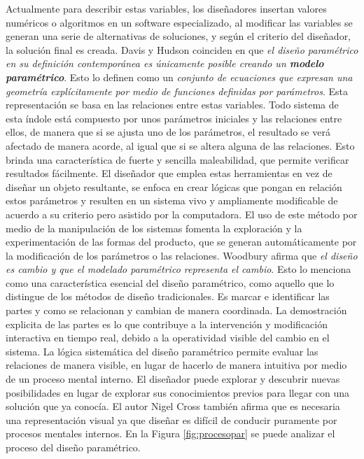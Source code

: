  Actualmente para describir estas variables, los diseñadores
insertan valores numéricos o algoritmos en un software especializado, al modificar las
variables se generan una serie de alternativas de soluciones, y según el criterio del diseñador, la solución final es creada. Davis y Hudson \citep{Kaled2016} coinciden en que \textit{el diseño paramétrico en su definición contemporánea es únicamente posible creando un \textbf{modelo paramétrico}}. Esto lo definen como un \textit{conjunto de ecuaciones que expresan una geometría explícitamente por medio de funciones definidas por parámetros}. Esta representación se basa en las relaciones entre estas variables. Todo sistema de esta índole está compuesto por unos parámetros iniciales y las relaciones entre ellos, de manera que si se ajusta uno de los parámetros, el resultado se verá afectado de manera acorde, al igual que si se altera alguna de las relaciones. Esto brinda una característica de fuerte y sencilla maleabilidad, que permite verificar resultados fácilmente. El diseñador que emplea estas herramientas en vez de diseñar un objeto resultante, se enfoca en crear lógicas que pongan en relación estos parámetros y resulten en un sistema vivo y ampliamente modificable de acuerdo a su criterio pero asistido por la computadora. El uso de este método por medio de la manipulación de los sistemas fomenta la exploración y la experimentación de las formas del producto, que se generan automáticamente por la modificación de los parámetros o las relaciones. Woodbury \citep{Kaled2016} afirma que \textit{el diseño es cambio y que el modelado paramétrico representa el cambio}. Esto lo menciona como una característica esencial del diseño paramétrico, como aquello que lo distingue de los métodos de diseño tradicionales. Es marcar e identificar las partes y como se relacionan y cambian de manera coordinada. La demostración explicita de las partes es lo que contribuye a la intervención y modificación interactiva en tiempo real, debido a la operatividad visible del cambio en el sistema. La lógica sistemática del diseño paramétrico permite evaluar las relaciones de manera visible, en lugar de hacerlo de manera intuitiva por medio de un proceso mental interno.
El diseñador puede explorar y descubrir nuevas posibilidades en lugar de explorar sus conocimientos previos para llegar con una solución que ya conocía.
El autor Nigel Cross \citep{Kaled2016} también afirma que es necesaria una representación visual ya que diseñar es difícil de conducir puramente por procesos mentales internos. En la Figura \ref{fig:procesopar} se puede analizar el proceso del diseño paramétrico.

